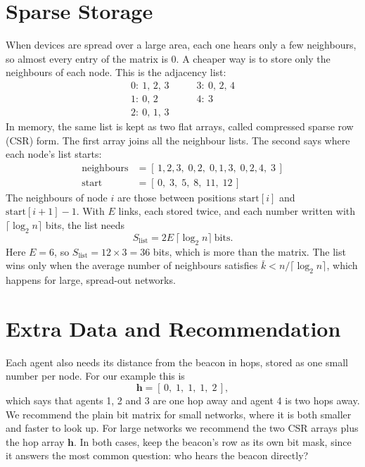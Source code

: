 \documentclass[conference]{IEEEtran}
\begin{document}
\section{Sparse Storage}

When devices are spread over a large area, each one hears only a few neighbours, so almost every entry of the matrix is $0$. A cheaper way is to store only the neighbours of each node. This is the adjacency list:
\begin{equation}
\begin{array}{ll}
0:\ 1,\,2,\,3 & \qquad 3:\ 0,\,2,\,4\\
1:\ 0,\,2     & \qquad 4:\ 3\\
2:\ 0,\,1,\,3 &
\end{array}
\end{equation}
In memory, the same list is kept as two flat arrays, called compressed sparse row (CSR) form. The first array joins all the neighbour lists. The second says where each node's list starts:
\begin{align}
\text{neighbours} &= [\,1,2,3,\;0,2,\;0,1,3,\;0,2,4,\;3\,]\\
\text{start} &= [\,0,\;3,\;5,\;8,\;11,\;12\,]
\end{align}
The neighbours of node $i$ are those between positions $\text{start}[i]$ and $\text{start}[i+1]-1$. With $E$ links, each stored twice, and each number written with $\lceil\log_2 n\rceil$ bits, the list needs
\begin{equation}
S_{\text{list}} = 2E\,\lceil\log_2 n\rceil\ \text{bits}.
\end{equation}
Here $E=6$, so $S_{\text{list}}=12\times 3=36$ bits, which is more than the matrix. The list wins only when the average number of neighbours satisfies $\bar{k}<n/\lceil\log_2 n\rceil$, which happens for large, spread-out networks.

\section{Extra Data and Recommendation}

Each agent also needs its distance from the beacon in hops, stored as one small number per node. For our example this is
\begin{equation}
\mathbf{h}=[\,0,\;1,\;1,\;1,\;2\,],
\end{equation}
which says that agents 1, 2 and 3 are one hop away and agent 4 is two hops away. We recommend the plain bit matrix for small networks, where it is both smaller and faster to look up. For large networks we recommend the two CSR arrays plus the hop array $\mathbf{h}$. In both cases, keep the beacon's row as its own bit mask, since it answers the most common question: who hears the beacon directly?
\end{document}
